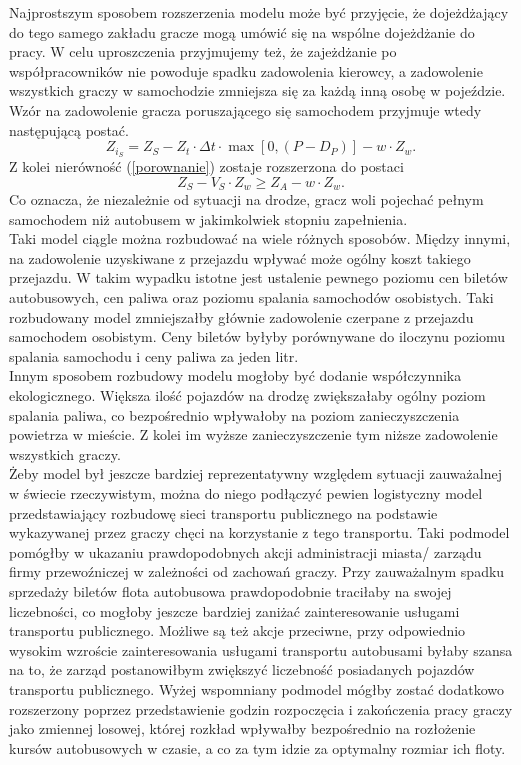 \documentclass[12pt,a4paper]{article}
\begin{document}
Najprostszym sposobem rozszerzenia modelu może być przyjęcie, że dojeżdżający do tego samego zakładu gracze mogą umówić się na wspólne dojeżdżanie do pracy. W celu uproszczenia przyjmujemy też, że zajeżdżanie po współpracowników nie powoduje spadku zadowolenia kierowcy, a zadowolenie wszystkich graczy w samochodzie zmniejsza się za każdą inną osobę w pojeździe. Wzór na zadowolenie gracza poruszającego się samochodem przyjmuje wtedy następującą postać.
\begin{equation}
Z_{i_S} = Z_S - Z_t \cdot \Delta{t} \cdot \max[0, (P - D_{P})] - w \cdot Z_w.
\end{equation}
Z kolei nierówność (\ref{porownanie}) zostaje rozszerzona do postaci
\begin{equation}
Z_S - V_S \cdot Z_w \geq Z_A - w \cdot Z_w.
\end{equation}
Co oznacza, że niezależnie od sytuacji na drodze, gracz woli pojechać pełnym samochodem niż autobusem w jakimkolwiek stopniu zapełnienia.\\

Taki model ciągle można rozbudować na wiele różnych sposobów. Między innymi, na zadowolenie uzyskiwane z przejazdu wpływać może ogólny koszt takiego przejazdu. W takim wypadku istotne jest ustalenie pewnego poziomu cen biletów autobusowych, cen paliwa oraz poziomu spalania samochodów osobistych. Taki rozbudowany model zmniejszałby głównie zadowolenie czerpane z przejazdu samochodem osobistym. Ceny biletów byłyby porównywane do iloczynu poziomu spalania samochodu i ceny paliwa za jeden litr.\\

Innym sposobem rozbudowy modelu mogłoby być dodanie współczynnika ekologicznego. Większa ilość pojazdów na drodzę zwiększałaby ogólny poziom spalania paliwa, co bezpośrednio wpływałoby na poziom zanieczyszczenia powietrza w mieście. Z kolei im wyższe zanieczyszczenie tym niższe zadowolenie wszystkich graczy.\\

Żeby model był jeszcze bardziej reprezentatywny względem sytuacji zauważalnej w świecie rzeczywistym, można do niego podłączyć pewien logistyczny model przedstawiający rozbudowę sieci transportu publicznego na podstawie wykazywanej przez graczy chęci na korzystanie z tego transportu. Taki podmodel pomógłby w ukazaniu prawdopodobnych akcji administracji miasta/ zarządu firmy przewoźniczej w zależności od zachowań graczy. Przy zauważalnym spadku sprzedaży biletów flota autobusowa prawdopodobnie traciłaby na swojej liczebności, co mogłoby jeszcze bardziej zaniżać zainteresowanie usługami transportu publicznego. Możliwe są też akcje przeciwne, przy odpowiednio wysokim wzroście zainteresowania usługami transportu autobusami byłaby szansa na to, że zarząd postanowiłbym zwiększyć liczebność posiadanych pojazdów transportu publicznego. Wyżej wspomniany podmodel mógłby zostać dodatkowo rozszerzony poprzez przedstawienie godzin rozpoczęcia i zakończenia pracy graczy jako zmiennej losowej, której rozkład wpływałby bezpośrednio na rozłożenie kursów autobusowych w czasie, a co za tym idzie za optymalny rozmiar ich floty.\\
\end{document}
